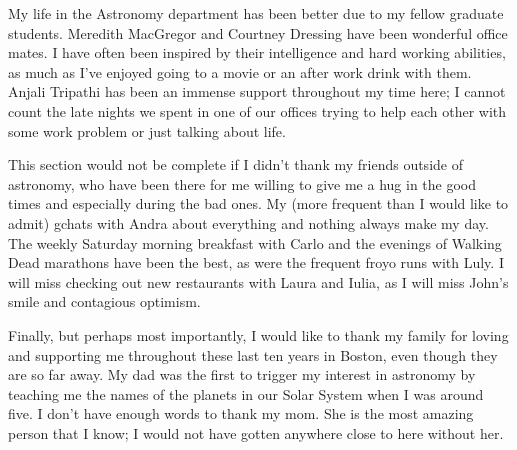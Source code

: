 My life in the Astronomy department has been better due to my fellow graduate students. Meredith MacGregor and Courtney Dressing have been wonderful office mates. I have often been inspired by their intelligence and hard working abilities, as much as I've enjoyed going to a movie or an after work drink with them. Anjali Tripathi has been an immense support throughout my time here; I cannot count the late nights we spent in one of our offices trying to help each other with some work problem or just talking about life. 

This section would not be complete if I didn't thank my friends outside of astronomy, who have been there for me willing to give me a hug in the good times and especially during the bad ones. My (more frequent than I would like to admit) gchats with Andra about everything and nothing always make my day. The weekly Saturday morning breakfast with Carlo and the evenings of Walking Dead marathons have been the best, as were the frequent froyo runs with Luly. I will miss checking out new restaurants with Laura and Iulia, as I will miss John's smile and contagious optimism.

Finally, but perhaps most importantly, I would like to thank my family for loving and supporting me throughout these last ten years in Boston, even though they are so far away. My dad was the first to trigger my interest in astronomy by teaching me the names of the planets in our Solar System when I was around five. I don't have enough words to thank my mom. She is the most amazing person that I know; I would not have gotten anywhere close to here without her. 